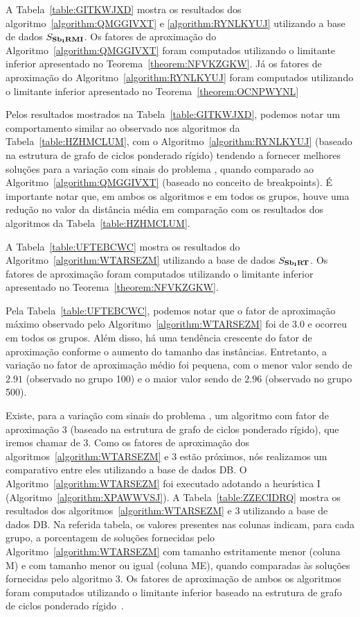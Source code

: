 A Tabela~\ref{table:GITKWJXD} mostra os resultados dos algoritmo~\ref{algorithm:QMGGIVXT} e \ref{algorithm:RYNLKYUJ} utilizando a base de dados $S_{\textbf{Sb\textsubscript{I}RMI}}{}$. Os fatores de aproximação do Algoritmo~\ref{algorithm:QMGGIVXT} foram computados utilizando o limitante inferior apresentado no Teorema~\ref{theorem:NFVKZGKW}. Já os fatores de aproximação do Algoritmo~\ref{algorithm:RYNLKYUJ} foram computados utilizando o limitante inferior apresentado no Teorema~\ref{theorem:OCNPWYNL}



Pelos resultados mostrados na Tabela~\ref{table:GITKWJXD}, podemos notar um comportamento similar ao observado nos algoritmos da Tabela~\ref{table:HZHMCLUM}, com o Algoritmo~\ref{algorithm:RYNLKYUJ} (baseado na estrutura de grafo de ciclos ponderado rígido) tendendo a fornecer melhores soluções para a variação com sinais do problema \SbIRMI{}, quando comparado ao Algoritmo~\ref{algorithm:QMGGIVXT} (baseado no conceito de breakpoints). É importante notar que, em ambos os algoritmos e em todos os grupos, houve uma redução no valor da distância média em comparação com os resultados dos algoritmos da Tabela~\ref{table:HZHMCLUM}.

A Tabela~\ref{table:UFTEBCWC} mostra os resultados do Algoritmo~\ref{algorithm:WTARSEZM} utilizando a base de dados $S_{\textbf{Sb\textsubscript{I}RT}}{}$. Os fatores de aproximação foram computados utilizando o limitante inferior apresentado no Teorema~\ref{theorem:NFVKZGKW}.



Pela Tabela~\ref{table:UFTEBCWC}, podemos notar que o fator de aproximação máximo observado pelo Algoritmo~\ref{algorithm:WTARSEZM} foi de $3.0$ e ocorreu em todos os grupos. Além disso, há uma tendência crescente do fator de aproximação conforme o aumento do tamanho das instâncias. Entretanto, a variação no fator de aproximação médio foi pequena, com o menor valor sendo de $2.91$ (observado no grupo 100) e o maior valor sendo de $2.96$ (observado no grupo 500).

Existe, para a variação com sinais do problema \SbIRT{}, um algoritmo com fator de aproximação $3$ (baseado na estrutura de grafo de ciclos ponderado rígido), que iremos chamar de $3$\SbIRT{}. Como os fatores de aproximação dos algoritmos~\ref{algorithm:WTARSEZM} e $3$\SbIRT{} estão próximos, nós realizamos um comparativo entre eles utilizando a base de dados DB\textsubscript{\SbIRT}. O Algoritmo~\ref{algorithm:WTARSEZM} foi executado adotando a heurística I (Algoritmo~\ref{algorithm:XPAWWVSJ}). A Tabela~\ref{table:ZZECIDRQ} mostra os resultados dos algoritmos~\ref{algorithm:WTARSEZM} e $3$\SbIRT{} utilizando a base de dados DB\textsubscript{\SbIRT}. Na referida tabela, os valores presentes nas colunas indicam, para cada grupo, a porcentagem de soluções fornecidas pelo Algoritmo~\ref{algorithm:WTARSEZM} com tamanho estritamente menor (coluna M) e com tamanho menor ou igual (coluna ME), quando comparadas às soluções fornecidas pelo algoritmo $3$\SbIRT{}. Os fatores de aproximação de ambos os algoritmos foram computados utilizando o limitante inferior baseado na estrutura de grafo de ciclos ponderado rígido~\cite[Teorema 3.8]{2021a-oliveira-etal}. 

